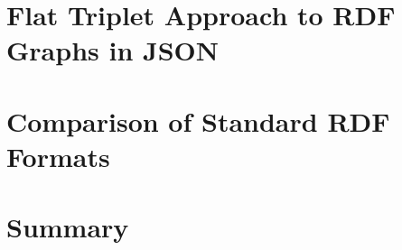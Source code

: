 \section{Flat Triplet Approach to RDF Graphs in JSON}

\section{Comparison of Standard RDF Formats}

\section{Summary}


